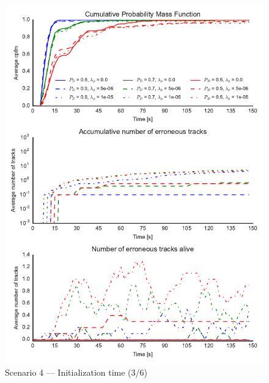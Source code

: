 \begin{figure}
\centering
\includegraphics{Figures/plots/Scenario4_Init-Time(3-6).pdf}
\caption{Scenario 4 --- Initialization time (3/6)}\label{fig:init4_time_3-6}
\end{figure}